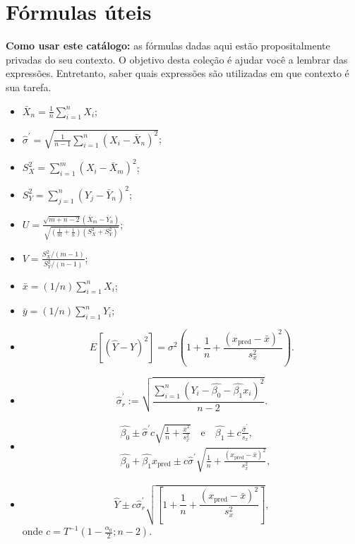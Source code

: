 \documentclass[a4paper,10pt, notitlepage]{report}
\begin{document}
\section*{Fórmulas úteis}
\textbf{Como usar este catálogo:} as fórmulas dadas aqui estão propositalmente privadas do seu contexto.
O objetivo desta coleção é ajudar você a lembrar das expressões.
Entretanto, saber quais expressões são utilizadas em que contexto é sua tarefa.
\begin{itemize}
 \item $ \bar{X}_n = \frac{1}{n} \sum_{i=1}^n X_i$;
 \item $\hat{\sigma}^\prime = \sqrt{\frac{1}{n-1}\sum_{i=1}^n \left(X_i - \bar{X}_n\right)^2}$;
 \item $S_X^2 = \sum_{i=1}^m (X_i-\bar{X}_m)^2$;
 \item $S_Y^2 = \sum_{j=1}^n (Y_j-\bar{Y}_n)^2$;
 \item $U = \frac{\sqrt{m + n - 2}(\bar{X}_m - \bar{Y}_n)}{\sqrt{\left(\frac{1}{m} + \frac{1}{n}\right) (S_X^2 + S_Y^2)}}$;
 \item $ V = \frac{S_X^2/(m-1)}{S_Y^2/(n-1)}$;
 \item $\bar{x} = (1/n)\sum_{i=1}^n X_i$;
 \item $\bar{y} = (1/n)\sum_{i=1}^n Y_i$;
\item \begin{equation*}
        E\left[\left(\hat{Y} - Y\right)^2\right] = \sigma^2 \left(1 + \frac{1}{n} + \frac{\left(x_{\text{pred}}-\bar{x}\right)^2}{s_x^2}\right).
      \end{equation*}
  \item \begin{equation*}
 \hat{\sigma}_r^\prime := \sqrt{\frac{\sum_{i=1}^n \left(Y_i - \hat{\beta_0} - \hat{\beta_1}x_i \right)^2}{n-2}}.
\end{equation*}     
\item \begin{align*}
 &\hat{\beta_0} \pm \hat{\sigma}^\prime c\sqrt{\frac{1}{n} + \frac{\bar{x}^2}{s_x^2}}\quad \text{e}\quad \hat{\beta_1} \pm c\frac{\hat{\sigma}^\prime}{s_x},\\
 &\hat{\beta_0} + \hat{\beta_1}x_{\text{pred}} \pm c \hat{\sigma}^\prime \sqrt{\frac{1}{n} + \frac{\left(x_{\text{pred}}-\bar{x}\right)^2}{s_x^2} },
\end{align*}    
\item \begin{equation*}
 \hat{Y} \pm c\hat{\sigma}_r^\prime \sqrt{\left[ 1+ \frac{1}{n} + \frac{\left(x_{\text{pred}}-\bar{x}\right)^2}{s_x^2} \right]},
\end{equation*}
onde $c = T^{-1}(1-\frac{\alpha_0}{2}; n-2)$.
\end{itemize}
\end{document}
